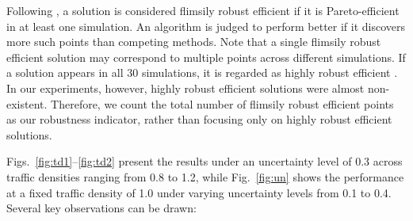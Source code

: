 \documentclass{article}
\begin{document}
Following \cite{ide2016robustness}, a solution is considered flimsily robust efficient if it is Pareto-efficient in at least one simulation. An algorithm is judged to perform better if it discovers more such points than competing methods. Note that a single flimsily robust efficient solution may correspond to multiple points across different simulations. If a solution appears in all 30 simulations, it is regarded as highly robust efficient \cite{ide2016robustness}. In our experiments, however, highly robust efficient solutions were almost non-existent. Therefore, we count the total number of flimsily robust efficient points as our robustness indicator, rather than focusing only on highly robust efficient solutions.

Figs.~\ref{fig:td1}–\ref{fig:td2} present the results under an uncertainty level of 0.3 across traffic densities ranging from 0.8 to 1.2, while Fig.~\ref{fig:un} shows the performance at a fixed traffic density of 1.0 under varying uncertainty levels from 0.1 to 0.4. Several key observations can be drawn:
\end{document}
